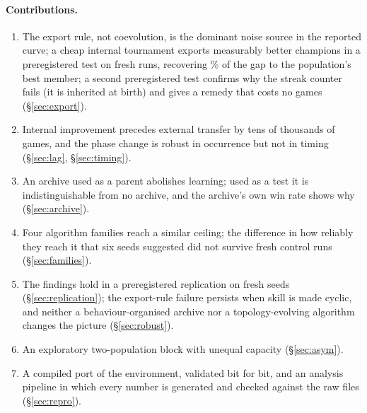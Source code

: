 \documentclass[11pt]{article}
\begin{document}
\paragraph{Contributions.}
\begin{enumerate}
\item The export rule, not coevolution, is the dominant noise source in the
  reported curve; a cheap internal tournament exports measurably better
  champions in a preregistered test on fresh runs, recovering
  \nXRecoveredPct\% of the gap to the population's best member; a second
  preregistered test confirms why the streak counter fails (it is inherited at
  birth) and gives a remedy that costs no games (\S\ref{sec:export}).
\item Internal improvement precedes external transfer by tens of thousands of
  games, and the phase change is robust in occurrence but not in timing
  (\S\ref{sec:lag}, \S\ref{sec:timing}).
\item An archive used as a parent abolishes learning; used as a test it is
  indistinguishable from no archive, and the archive's own win rate shows why
  (\S\ref{sec:archive}).
\item Four algorithm families reach a similar ceiling; the difference in how
  reliably they reach it that six seeds suggested did not survive fresh control
  runs (\S\ref{sec:families}).
\item The findings hold in a preregistered replication on fresh seeds
  (\S\ref{sec:replication}); the export-rule failure persists when skill is
  made cyclic, and neither a behaviour-organised archive nor a
  topology-evolving algorithm changes the picture (\S\ref{sec:robust}).
\item An exploratory two-population block with unequal capacity
  (\S\ref{sec:asym}).
\item A compiled port of the environment, validated bit for bit, and an
  analysis pipeline in which every number is generated and checked against the
  raw files (\S\ref{sec:repro}).
\end{enumerate}
\end{document}
